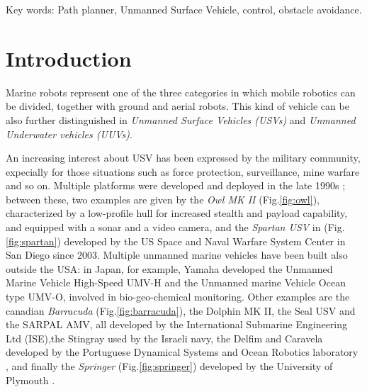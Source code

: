 \documentclass[12pt]{article}
\begin{document}
Key words: Path planner, Unmanned Surface Vehicle, control, obstacle avoidance.

%



\section{Introduction} \label{introduction}

      Marine robots represent one of the three categories in which mobile robotics can be divided, together with ground and aerial robots. This kind of vehicle can be also further distinguished in \textit{Unmanned Surface Vehicles (USVs)} and \textit{Unmanned Underwater vehicles (UUVs)}.

      \indent An increasing interest about USV has been expressed by the military community, expecially for those situations such as force protection, surveillance, mine warfare and so on. Multiple platforms were developed and deployed in the late 1990s  \parencite{Bertram2008}; between these, two examples are given by the \textit{Owl MK II} (Fig.\ref{fig:owl}), characterized by a low-profile hull for increased stealth and payload capability, and equipped with a sonar and a video camera, and the \textit{Spartan USV} in (Fig.\ref{fig:spartan}) developed by the US Space and Naval Warfare System Center in San Diego since 2003. Multiple unmanned marine vehicles have been built also outside the USA: in Japan, for example, Yamaha developed the Unmanned Marine Vehicle High-Speed UMV-H and the Unmanned marine Vehicle Ocean type UMV-O, involved in bio-geo-chemical monitoring. Other examples are the canadian \textit{Barracuda} (Fig.\ref{fig:barracuda}), the Dolphin MK II, the Seal USV and the SARPAL AMV, all developed by the International Submarine Engineering Ltd (ISE),the Stingray used by the Israeli navy, the Delfim and Caravela developed by the Portuguese Dynamical Systems and Ocean Robotics laboratory \parencite{4124872}, and finally the \textit{Springer} (Fig.\ref{fig:springer}) developed by the University of Plymouth \parencite{Naeem2009} .
\end{document}
